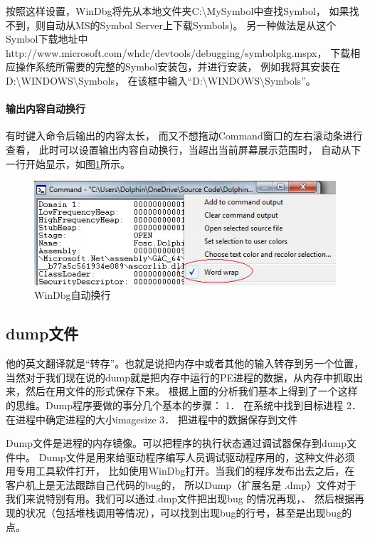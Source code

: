 \documentclass{book}
\begin{document}
按照这样设置，WinDbg将先从本地文件夹C:\textbackslash MySymbol中查找Symbol，
如果找不到，则自动从MS的Symbol Server上下载Symbols)。
另一种做法是从这个Symbol下载地址中http://www.microsoft.com/whdc/devtools/debugging/symbolpkg.mspx，
下载相应操作系统所需要的完整的Symbol安装包，并进行安装，
例如我将其安装在D:\textbackslash WINDOWS\textbackslash Symbols，
在该框中输入“D:\textbackslash WINDOWS\textbackslash Symbols”。

\paragraph{输出内容自动换行}有时键入命令后输出的内容太长，
而又不想拖动Command窗口的左右滚动条进行查看，
此时可以设置输出内容自动换行，当超出当前屏幕展示范围时，
自动从下一行开始显示，如图\ref{fig:WinDbgAutoWrapWord}所示。

\begin{figure}[htbp]
	\centering
	\includegraphics[scale=1]{WinDbgAutoWrapWord.jpg}
	\caption{WinDbg自动换行}
	\label{fig:WinDbgAutoWrapWord}
\end{figure}


\subsection{dump文件}

他的英文翻译就是“转存”。也就是说把内存中或者其他的输入转存到另一个位置，
当然对于我们现在说的dump就是把内存中运行的PE进程的数据，从内存中抓取出来，然后在用文件的形式保存下来。 
根据上面的分析我们基本上得到了一个这样的思维。Dump程序要做的事分几个基本的步骤： 
1．  在系统中找到目标进程 
2．  在进程中确定进程的大小imagesize 
3．  把进程中的数据保存到文件 

Dump文件是进程的内存镜像。可以把程序的执行状态通过调试器保存到dump文件中。
Dump文件是用来给驱动程序编写人员调试驱动程序用的，这种文件必须用专用工具软件打开，
比如使用WinDbg打开。当我们的程序发布出去之后，在客户机上是无法跟踪自己代码的bug的，
所以Dump（扩展名是 .dmp）文件对于我们来说特别有用。我们可以通过.dmp文件把出现bug 的情况再现，、
然后根据再现的状况（包括堆栈调用等情况），可以找到出现bug的行号，甚至是出现bug的点。
\end{document}
